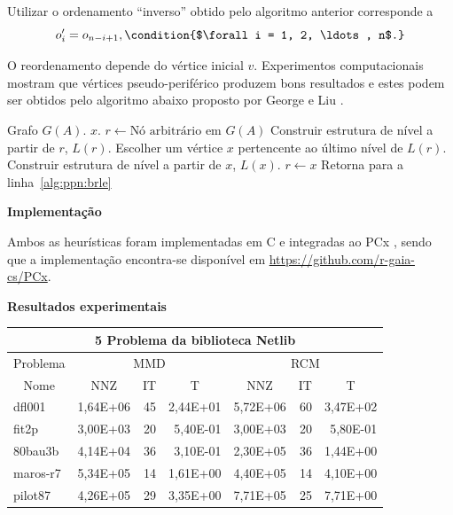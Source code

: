 \documentclass[]{beamer}
\begin{document}
\begin{frame}[t,fragile]
\begin{columns}[t]
\begin{column}{0.4\textwidth}
  Utilizar o ordenamento ``inverso'' obtido pelo algoritmo anterior corresponde
  a
  \begin{dmath*}
    o_i' = o_{n - i + 1}, \condition{$\forall i = 1, 2, \ldots, n$.}
  \end{dmath*}

  O reordenamento depende do vértice inicial $v$. Experimentos computacionais
  mostram que vértices pseudo-periférico produzem bons resultados e estes podem
  ser obtidos pelo algoritmo abaixo proposto por George e Liu
  \cite{George:1979:NodeFinder}.

  \begin{algorithmic}[1]
      \REQUIRE Grafo $G(A)$.
      \ENSURE $x$.
      \STATE $r \longleftarrow \text{Nó arbitrário em }G(A)$
      \STATE Construir estrutura de nível a partir de $r$, $L(r)$.
      \label{alg:ppn:brle}
      \STATE Escolher um vértice $x$ pertencente ao último nível de
      $L(r)$.
      \STATE Construir estrutura de nível a partir de $x$, $L(x)$.
          \STATE $r \longleftarrow x$
          \STATE Retorna para a linha~\ref{alg:ppn:brle}
      \ENDIF
  \end{algorithmic}

  \textbf{Implementação}

  Ambos as heurísticas foram implementadas em C e integradas ao PCx \cite{PCx},
  sendo que a implementação encontra-se disponível em
  \url{https://github.com/r-gaia-cs/PCx}.

  \textbf{Resultados experimentais}
  \begin{center}
\begin{tabular}{|l|r|r|r|r|r|r|}
\hline
\multicolumn{7}{|c|}{5 Problema da biblioteca Netlib} \\ \hline
\multicolumn{1}{|c|}{Problema} & \multicolumn{3}{|c|}{MMD} &         \multicolumn{3}{|c|}{RCM} \\ \hline
\multicolumn{1}{|c|}{Nome} &
        \multicolumn{1}{|c|}{NNZ} & \multicolumn{1}{|c|}{IT} &
        \multicolumn{1}{|c|}{T} &
        \multicolumn{1}{|c|}{NNZ} & \multicolumn{1}{|c|}{IT} &
        \multicolumn{1}{|c|}{T} \\ \hline
dfl001       & 1,64E+06 & 45 & 2,44E+01 & 5,72E+06 & 60 & 3,47E+02 \\ \hline
fit2p        & 3,00E+03 & 20 & 5,40E-01 & 3,00E+03 & 20 & 5,80E-01 \\ \hline
80bau3b      & 4,14E+04 & 36 & 3,10E-01 & 2,30E+05 & 36 & 1,44E+00 \\ \hline
maros-r7     & 5,34E+05 & 14 & 1,61E+00 & 4,40E+05 & 14 & 4,10E+00 \\ \hline
pilot87      & 4,26E+05 & 29 & 3,35E+00 & 7,71E+05 & 25 & 7,71E+00 \\ \hline
\end{tabular}
  \end{center}


\end{column}
\end{columns}
\end{frame}
\end{document}
